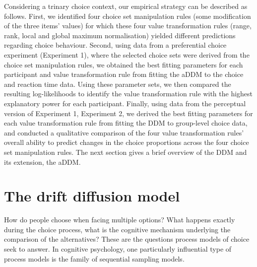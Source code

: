 \documentclass[11pt,a4paper]{article}
\begin{document}
Considering a trinary choice context, our empirical strategy can be described as follows. First, we identified four choice set manipulation rules (some modification of the three items' values) for which these four value transformation rules (range, rank, local and global maximum normalisation) yielded different predictions regarding choice behaviour. Second, using data from a preferential choice experiment (Experiment 1), where the selected choice sets were derived from the choice set manipulation rules, we obtained the best fitting parameters for each participant and value transformation rule from fitting the aDDM to the choice and reaction time data. Using these parameter sets, we then compared the resulting log-likelihoods to identify the value transformation rule with the highest explanatory power for each participant. Finally, using data from the perceptual version of Experiment 1, Experiment 2, we derived the best fitting parameters for each value transformation rule from fitting the DDM to group-level choice data, and conducted a qualitative comparison of the four value transformation rules' overall ability to predict changes in the choice proportions across the four choice set manipulation rules. The next section gives a brief overview of the DDM and its extension, the aDDM.





\section{The drift diffusion model} \label{chap1addmexplain}


How do people choose when facing multiple options? What happens exactly during the choice process, what is the cognitive mechanism underlying the comparison of the alternatives? These are the questions process models of choice seek to answer. In cognitive psychology, one particularly influential type of process models is the family of sequential sampling models. 
\end{document}
